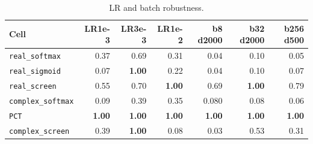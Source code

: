 \documentclass[11pt,a4paper]{article}
\theoremstyle{plain}
\theoremstyle{definition}
\begin{document}
\enlargethispage{3\baselineskip}
\begin{table}[H]
\centering
{\footnotesize
\setlength{\tabcolsep}{3pt}
\renewcommand{\arraystretch}{1.05}
\begin{tabular}{|l|r|r|r|r|r|r|}
\hline
Cell & LR1e-3 & LR3e-3 & LR1e-2 & b8 d2000 & b32 d2000 & b256 d500 \\
\hline
\texttt{real\_softmax} & 0.37 & 0.69 & 0.31 & 0.04 & 0.10 & 0.05 \\
\hline
\texttt{real\_sigmoid} & 0.07 & \textbf{1.00} & 0.22 & 0.04 & 0.10 & 0.07 \\
\hline
\texttt{real\_screen} & 0.55 & 0.70 & \textbf{1.00} & 0.69 & \textbf{1.00} & 0.79 \\
\hline
\texttt{complex\_softmax} & 0.09 & 0.39 & 0.35 & 0.080 & 0.08 & 0.06 \\
\hline
\texttt{PCT} & \textbf{1.00} & \textbf{1.00} & \textbf{1.00} & \textbf{1.00} & \textbf{1.00} & \textbf{1.00} \\
\hline
\texttt{complex\_screen} & 0.39 & \textbf{1.00} & 0.08 & 0.03 & 0.53 & 0.31 \\
\hline
\end{tabular}}
\captionsetup{skip=2pt}
\caption{LR and batch robustness.}
\end{table}
\end{document}
